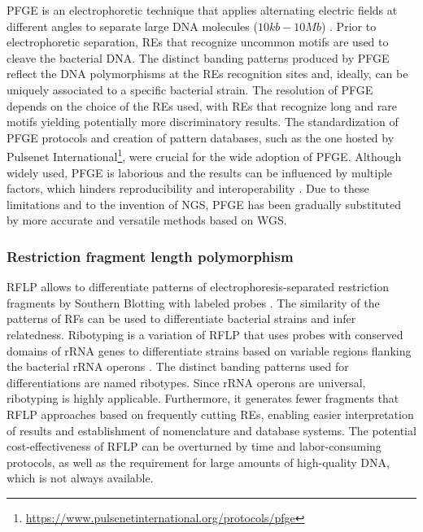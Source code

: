 \ac{PFGE} is an electrophoretic technique that applies alternating electric fields at different angles to separate large \ac{DNA} molecules ($10kb-10Mb$) \cite{schwartz_separation_1984, herschleb_pulsed-field_2007}. Prior to electrophoretic separation, \ac{REs} that recognize uncommon motifs are used to cleave the bacterial \ac{DNA}. The distinct banding patterns produced by \ac{PFGE} reflect the \ac{DNA} polymorphisms at the \ac{REs} recognition sites and, ideally, can be uniquely associated to a specific bacterial strain. The resolution of \ac{PFGE} depends on the choice of the \ac{REs} used, with \ac{REs} that recognize long and rare motifs yielding potentially more discriminatory results. The standardization of \ac{PFGE} protocols and creation of pattern databases, such as the one hosted by Pulsenet International\footnote{\url{https://www.pulsenetinternational.org/protocols/pfge}}, were crucial for the wide adoption of \ac{PFGE}. Although widely used, \ac{PFGE} is laborious and the results can be influenced by multiple factors, which hinders reproducibility and interoperability \cite{li_bacterial_2009}. Due to these limitations and to the invention of \ac{NGS}, \ac{PFGE} has been gradually substituted by more accurate and versatile methods based on \ac{WGS}.

\subsubsection{Restriction fragment length polymorphism}

\ac{RFLP} \cite{thibodeau_use_1987, todd_chromosome_2001} allows to differentiate patterns of electrophoresis-separated restriction fragments by Southern Blotting with labeled probes \cite{southern_detection_1975}. The similarity of the patterns of \ac{RFs} can be used to differentiate bacterial strains and infer relatedness. Ribotyping is a variation of \ac{RFLP} that uses probes with conserved domains of \ac{rRNA} genes to differentiate strains based on variable regions flanking the bacterial \ac{rRNA} operons \cite{bingen_use_1994}. The distinct banding patterns used for differentiations are named ribotypes. Since \ac{rRNA} operons are universal, ribotyping is highly applicable. Furthermore, it generates fewer fragments that \ac{RFLP} approaches based on frequently cutting \ac{REs}, enabling easier interpretation of results and establishment of nomenclature and database systems. The potential cost-effectiveness of \ac{RFLP} can be overturned by time and labor-consuming protocols, as well as the requirement for large amounts of high-quality \ac{DNA}, which is not always available.

